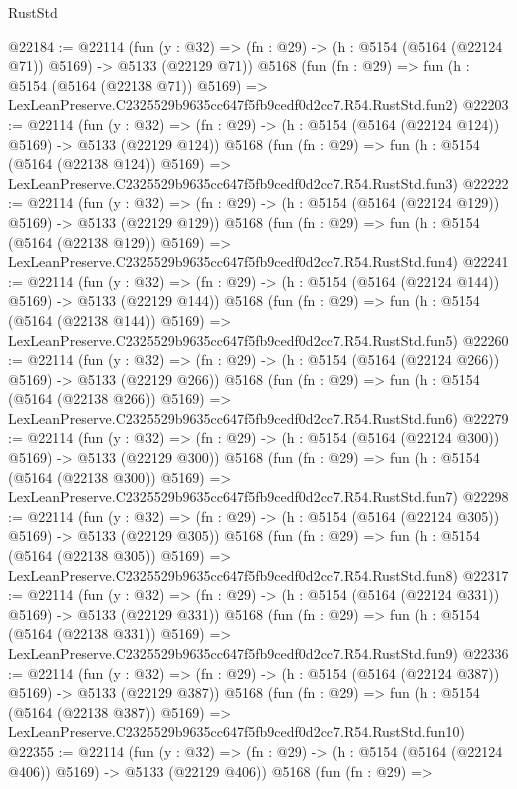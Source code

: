 \begin{lexlean}{RustStd}
\begin{coremodule}
@22184 := @22114
    (fun (y : @32) => (fn : @29) -> (h : @5154 (@5164 (@22124 @71)) @5169) -> @5133 (@22129 @71))
    @5168
    (fun (fn : @29) =>
    fun (h : @5154 (@5164 (@22138 @71)) @5169) =>
    LexLeanPreserve.C2325529b9635cc647f5fb9cedf0d2cc7.R54.RustStd.fun2)
@22203 := @22114
    (fun (y : @32) => (fn : @29) -> (h : @5154 (@5164 (@22124 @124)) @5169) -> @5133 (@22129 @124))
    @5168
    (fun (fn : @29) =>
    fun (h : @5154 (@5164 (@22138 @124)) @5169) =>
    LexLeanPreserve.C2325529b9635cc647f5fb9cedf0d2cc7.R54.RustStd.fun3)
@22222 := @22114
    (fun (y : @32) => (fn : @29) -> (h : @5154 (@5164 (@22124 @129)) @5169) -> @5133 (@22129 @129))
    @5168
    (fun (fn : @29) =>
    fun (h : @5154 (@5164 (@22138 @129)) @5169) =>
    LexLeanPreserve.C2325529b9635cc647f5fb9cedf0d2cc7.R54.RustStd.fun4)
@22241 := @22114
    (fun (y : @32) => (fn : @29) -> (h : @5154 (@5164 (@22124 @144)) @5169) -> @5133 (@22129 @144))
    @5168
    (fun (fn : @29) =>
    fun (h : @5154 (@5164 (@22138 @144)) @5169) =>
    LexLeanPreserve.C2325529b9635cc647f5fb9cedf0d2cc7.R54.RustStd.fun5)
@22260 := @22114
    (fun (y : @32) => (fn : @29) -> (h : @5154 (@5164 (@22124 @266)) @5169) -> @5133 (@22129 @266))
    @5168
    (fun (fn : @29) =>
    fun (h : @5154 (@5164 (@22138 @266)) @5169) =>
    LexLeanPreserve.C2325529b9635cc647f5fb9cedf0d2cc7.R54.RustStd.fun6)
@22279 := @22114
    (fun (y : @32) => (fn : @29) -> (h : @5154 (@5164 (@22124 @300)) @5169) -> @5133 (@22129 @300))
    @5168
    (fun (fn : @29) =>
    fun (h : @5154 (@5164 (@22138 @300)) @5169) =>
    LexLeanPreserve.C2325529b9635cc647f5fb9cedf0d2cc7.R54.RustStd.fun7)
@22298 := @22114
    (fun (y : @32) => (fn : @29) -> (h : @5154 (@5164 (@22124 @305)) @5169) -> @5133 (@22129 @305))
    @5168
    (fun (fn : @29) =>
    fun (h : @5154 (@5164 (@22138 @305)) @5169) =>
    LexLeanPreserve.C2325529b9635cc647f5fb9cedf0d2cc7.R54.RustStd.fun8)
@22317 := @22114
    (fun (y : @32) => (fn : @29) -> (h : @5154 (@5164 (@22124 @331)) @5169) -> @5133 (@22129 @331))
    @5168
    (fun (fn : @29) =>
    fun (h : @5154 (@5164 (@22138 @331)) @5169) =>
    LexLeanPreserve.C2325529b9635cc647f5fb9cedf0d2cc7.R54.RustStd.fun9)
@22336 := @22114
    (fun (y : @32) => (fn : @29) -> (h : @5154 (@5164 (@22124 @387)) @5169) -> @5133 (@22129 @387))
    @5168
    (fun (fn : @29) =>
    fun (h : @5154 (@5164 (@22138 @387)) @5169) =>
    LexLeanPreserve.C2325529b9635cc647f5fb9cedf0d2cc7.R54.RustStd.fun10)
@22355 := @22114
    (fun (y : @32) => (fn : @29) -> (h : @5154 (@5164 (@22124 @406)) @5169) -> @5133 (@22129 @406))
    @5168
    (fun (fn : @29) =>

\end{coremodule}
\end{lexlean}
